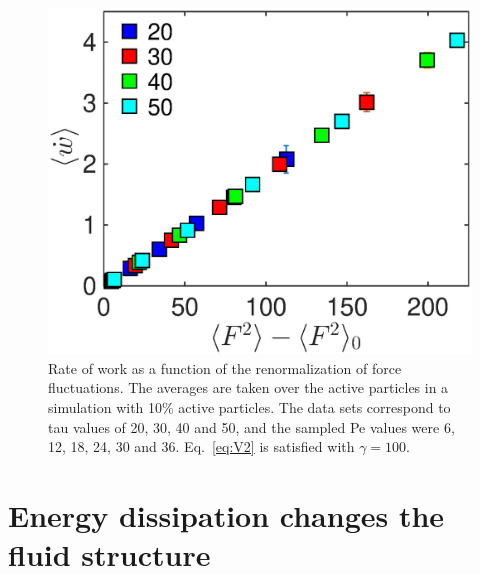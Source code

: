 \documentclass[pre, superscriptaddress, twocolumn,pre]{revtex4-1}
\begin{document}
\begin{figure}[tbp]
\centering
\includegraphics[width=0.85\linewidth]{dw_fvar_10p_active_av_active.eps}
\caption{Rate of work as a function of the renormalization of force fluctuations. The averages are taken over the active particles in a simulation with 10\% active particles. The data sets correspond to tau values of 20, 30, 40 and 50, and the sampled Pe values were 6, 12, 18, 24, 30 and 36. Eq.~\ref{eq:V2} is satisfied with $\gamma=100$.}
\label{fig:dw_fvar}
\end{figure}




\section{Energy dissipation changes the fluid structure}
\end{document}
